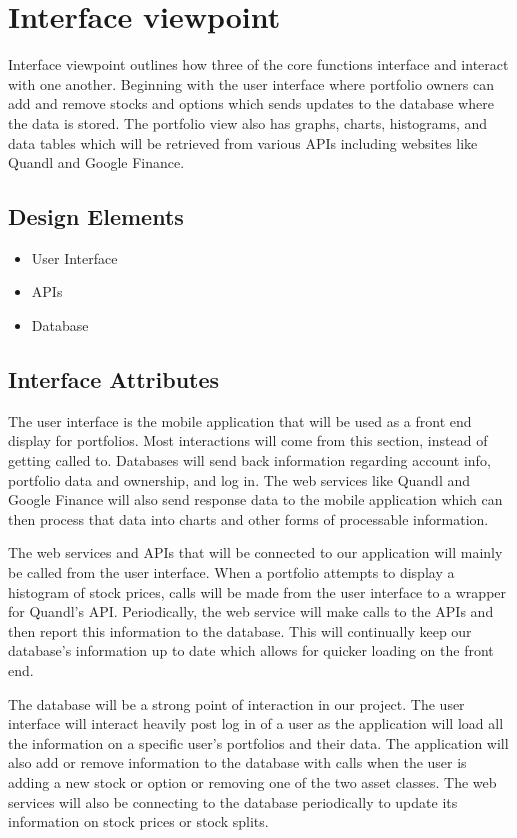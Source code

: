 \documentclass[onecolumn, draftclsnofoot,10pt, compsoc]{IEEEtran}
\begin{document}
\section{Interface viewpoint}

    Interface viewpoint outlines how three of the core functions interface and interact with one another.
    Beginning with the user interface where portfolio owners can add and remove stocks and options which
    sends updates to the database where the data is stored. The portfolio view also has graphs, charts, histograms,
    and data tables which will be retrieved from various APIs including websites like Quandl and Google Finance.
    
\subsection{Design Elements}
    \begin{itemize}
        \item User Interface
        \item APIs
        \item Database
    \end{itemize}

\subsection{Interface Attributes}

    The user interface is the mobile application that will be used as a front end display for portfolios. Most
    interactions will come from this section, instead of getting called to. Databases will send back information
    regarding account info, portfolio data and ownership, and log in. The web services like Quandl and Google 
    Finance will also send response data to the mobile application which can then process that data into charts 
    and other forms of processable information.
    
    The web services and APIs that will be connected to our application will mainly be called from the user
    interface. When a portfolio attempts to display a histogram of stock prices, calls will be made from the user
    interface to a wrapper for Quandl's API. Periodically, the web service will make calls to the APIs and 
    then report this information to the database. This will continually keep our database's information
    up to date which allows for quicker loading on the front end.
    
    The database will be a strong point of interaction in our project. The user interface will interact heavily
    post log in of a user as the application will load all the information on a specific user's portfolios and their
    data. The application will also add or remove information to the database with calls when the user is adding 
    a new stock or option or removing one of the two asset classes. The web services will also be connecting
    to the database periodically to update its information on stock prices or stock splits.
    
    
\end{document}
